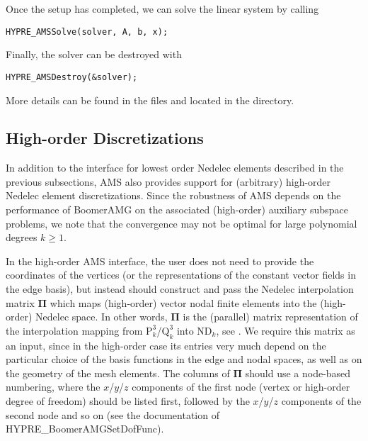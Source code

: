 \noindent
Once the setup has completed, we can solve the linear system by calling
\begin{display}\begin{verbatim}
HYPRE_AMSSolve(solver, A, b, x);
\end{verbatim}\end{display}

\noindent
Finally, the solver can be destroyed with
\begin{display}\begin{verbatim}
HYPRE_AMSDestroy(&solver);
\end{verbatim}\end{display}

\noindent
More details can be found in the files  and 
located in the  directory.

\subsection{High-order Discretizations}
In addition to the interface for lowest order Nedelec elements described in the
previous subsections, AMS also provides support for (arbitrary) high-order
Nedelec element discretizations. Since the robustness of AMS depends on the
performance of BoomerAMG on the associated (high-order) auxiliary subspace
problems, we note that the convergence may not be optimal for large polynomial
degrees $k \geq 1$.

In the high-order AMS interface, the user does not need to provide the
coordinates of the vertices (or the representations of the constant vector
fields in the edge basis), but instead should construct and pass the Nedelec
interpolation matrix ${\mathbf \Pi}$ which maps (high-order) vector nodal finite
elements into the (high-order) Nedelec space. In other words, ${\mathbf \Pi}$ is
the (parallel) matrix representation of the interpolation mapping from
$\mathrm{P}_k^3$/$\mathrm{Q}_k^3$ into $\mathrm{ND}_k$, see \cite{xu_H_curl,
  ams_jcm}.  We require this matrix as an input, since in the high-order case
its entries very much depend on the particular choice of the basis functions in
the edge and nodal spaces, as well as on the geometry of the mesh elements. The
columns of ${\mathbf \Pi}$ should use a node-based numbering, where the
$x$/$y$/$z$ components of the first node (vertex or high-order degree of
freedom) should be listed first, followed by the $x$/$y$/$z$ components of the
second node and so on (see the documentation of HYPRE\_BoomerAMGSetDofFunc).

